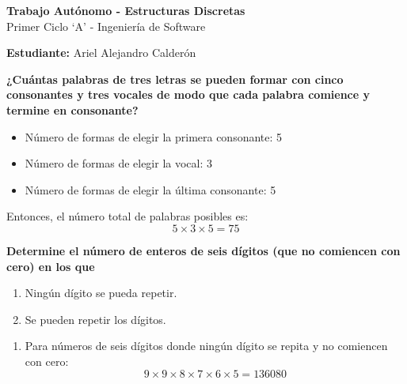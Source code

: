 \documentclass[answers]{exam} %
\begin{document}
\begin{center}
    \large\textbf{Trabajo Autónomo - Estructuras Discretas}\\[1em]
    \large Primer Ciclo \enquote*{A} - Ingeniería de Software\\[1em]
\end{center}

\vspace{0.5cm}
\large\textbf{Estudiante:} Ariel Alejandro Calderón
\vspace{0.5cm}

\begin{questions}

    \question \large\textbf{¿Cuántas palabras de tres letras se pueden formar con cinco consonantes y tres vocales de modo que cada palabra comience y termine en consonante?}
    \begin{solution}
        \begin{itemize}
            \item Número de formas de elegir la primera consonante: 5
            \item Número de formas de elegir la vocal: 3
            \item Número de formas de elegir la última consonante: 5
        \end{itemize}


        Entonces, el número total de palabras posibles es:
        \[
            5 \times 3 \times 5 = 75
        \]
    \end{solution}

    \vspace{0.5cm}

    \question \large\textbf{Determine el número de enteros de seis dígitos (que no comiencen con cero) en los que}
    \begin{enumerate}[label=\alph*.]
        \item Ningún dígito se pueda repetir.
        \item Se pueden repetir los dígitos.
    \end{enumerate}
    \begin{solution}
        \begin{enumerate}[label=\alph*.]
            \item Para números de seis dígitos donde ningún dígito se repita y no comiencen con cero:
                  \[
                      9 \times 9 \times 8 \times 7 \times 6 \times 5 = 136080
                  \]


\end{enumerate}
\end{solution}
\end{questions}
\end{document}
